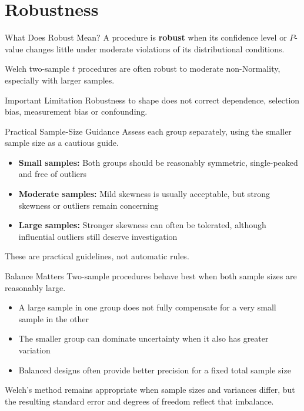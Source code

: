\documentclass[aspectratio=169,10pt]{beamer}
\begin{document}

\section{Robustness}

\begin{frame}{What Does Robust Mean?}
A procedure is \textbf{robust} when its confidence level or $P$-value changes little under moderate violations of its distributional conditions.

\vspace{0.2cm}
Welch two-sample $t$ procedures are often robust to moderate non-Normality, especially with larger samples.

\begin{block}{Important Limitation}
Robustness to shape does not correct dependence, selection bias, measurement bias or confounding.
\end{block}
\end{frame}

\begin{frame}{Practical Sample-Size Guidance}
Assess each group separately, using the smaller sample size as a cautious guide.

\begin{itemize}
  \item \textbf{Small samples:} Both groups should be reasonably symmetric, single-peaked and free of outliers
  \item \textbf{Moderate samples:} Mild skewness is usually acceptable, but strong skewness or outliers remain concerning
  \item \textbf{Large samples:} Stronger skewness can often be tolerated, although influential outliers still deserve investigation
\end{itemize}

These are practical guidelines, not automatic rules.
\end{frame}

\begin{frame}{Balance Matters}
Two-sample procedures behave best when both sample sizes are reasonably large.

\begin{itemize}
  \item A large sample in one group does not fully compensate for a very small sample in the other
  \item The smaller group can dominate uncertainty when it also has greater variation
  \item Balanced designs often provide better precision for a fixed total sample size
\end{itemize}

Welch's method remains appropriate when sample sizes and variances differ, but the resulting standard error and degrees of freedom reflect that imbalance.
\end{frame}
\end{document}
